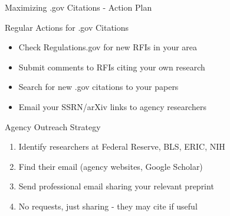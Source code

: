 \documentclass[11pt]{beamer}
\begin{document}
	\begin{frame}{Maximizing .gov Citations - Action Plan}
		\scriptsize
		\begin{block}{Regular Actions for .gov Citations}
			\begin{itemize}
				\item Check Regulations.gov for new RFIs in your area
				\item Submit comments to RFIs citing your own research
				\item Search for new .gov citations to your papers
				\item Email your SSRN/arXiv links to agency researchers
			\end{itemize}
		\end{block}
		\begin{block}{Agency Outreach Strategy}
			\begin{enumerate}
				\item Identify researchers at Federal Reserve, BLS, ERIC, NIH
				\item Find their email (agency websites, Google Scholar)
				\item Send professional email sharing your relevant preprint
				\item No requests, just sharing - they may cite if useful
			\end{enumerate}
		\end{block}
	\end{frame}
	
\end{document}
